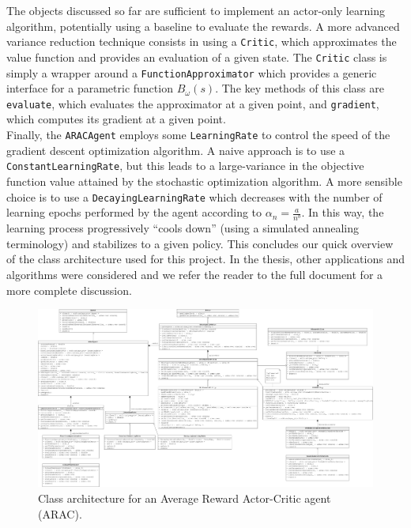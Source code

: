 The objects discussed so far are sufficient to implement an actor-only learning algorithm, potentially using a baseline to evaluate the rewards. A more advanced variance reduction technique consists in using a \lstinline{Critic}, which approximates the value function and provides an evaluation of a given state. The \lstinline{Critic} class is simply a wrapper around a \lstinline{FunctionApproximator} which provides a generic interface for a parametric function $B_\omega(s)$. The key methods of this class are \lstinline{evaluate}, which evaluates the approximator at a given point, and \lstinline{gradient}, which computes its gradient at a given point.\\
Finally, the \lstinline{ARACAgent} employs some \lstinline{LearningRate} to control the speed of the gradient descent optimization algorithm. A naive approach is to use a \lstinline{ConstantLearningRate}, but this leads to a large-variance in the objective function value attained by the stochastic optimization algorithm. A more sensible choice is to use a \lstinline{DecayingLearningRate} which decreases with the number of learning epochs performed by the agent according to $\alpha_n = \frac{a}{n^b}$. In this way, the learning process progressively ``cools down'' (using a simulated annealing terminology) and stabilizes to a given policy. This concludes our quick overview of the class architecture used for this project. In the thesis, other applications and algorithms were considered and we refer the reader to the full document for a more complete discussion.
\begin{figure}
    \includegraphics[width=\textwidth]{Images/A_agent}
    \caption{Class architecture for an Average Reward Actor-Critic agent (ARAC).}
    \label{fig:class_architecture_arac}
\end{figure}
\clearpage

